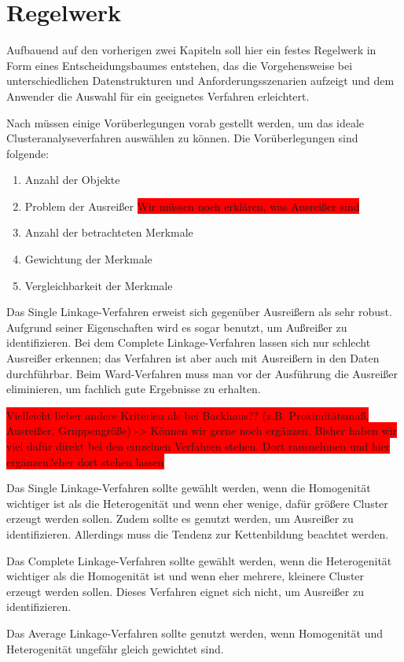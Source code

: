 \chapter{Regelwerk}

Aufbauend auf den vorherigen zwei Kapiteln soll hier ein festes Regelwerk in Form eines Entscheidungsbaumes entstehen, das die Vorgehensweise bei unterschiedlichen Datenstrukturen und Anforderungsszenarien aufzeigt und dem Anwender die Auswahl für ein geeignetes Verfahren erleichtert.

Nach \citet[S. 510]{Backhaus.2016} müssen einige Vorüberlegungen vorab gestellt werden, um das ideale Clusteranalyseverfahren auswählen zu können. Die Vorüberlegungen sind folgende:
\begin{enumerate}
    \item Anzahl der Objekte
    \item Problem der Ausreißer \colorbox{red}{Wir müssen noch erklären, was Ausreißer sind}
    \item Anzahl der betrachteten Merkmale
    \item Gewichtung der Merkmale
    \item Vergleichbarkeit der Merkmale
\end{enumerate}

Das Single Linkage-Verfahren erweist sich gegenüber Ausreißern als sehr robust. Aufgrund seiner Eigenschaften wird es sogar benutzt, um Außreißer zu identifizieren. Bei dem Complete Linkage-Verfahren lassen sich nur schlecht Ausreißer erkennen; das Verfahren ist aber auch mit Ausreißern in den Daten durchführbar. Beim Ward-Verfahren muss man vor der Ausführung die Ausreißer eliminieren, um fachlich gute Ergebnisse zu erhalten.

\colorbox{red}{Vielleicht lieber andere Kriterien als bei Backhaus?? (z.B. Proximitätsmaß, Ausreißer, Gruppengröße) -> Können wir gerne noch ergänzen. Bisher haben wir viel dafür direkt bei den einzelnen Verfahren stehen. Dort rausnehmen und hier ergänzen?eher dort stehen lassen}

Das Single Linkage-Verfahren sollte gewählt werden, wenn die Homogenität wichtiger ist als die Heterogenität und wenn eher wenige, dafür größere Cluster erzeugt werden sollen. Zudem sollte es genutzt werden, um Ausreißer zu identifizieren. Allerdings muss die Tendenz zur Kettenbildung beachtet werden.

Das Complete Linkage-Verfahren sollte gewählt werden, wenn die Heterogenität wichtiger als die Homogenität ist und wenn eher mehrere, kleinere Cluster erzeugt werden sollen. Dieses Verfahren eignet sich nicht, um Ausreißer zu identifizieren.

Das Average Linkage-Verfahren sollte genutzt werden, wenn Homogenität und Heterogenität ungefähr gleich gewichtet sind.
